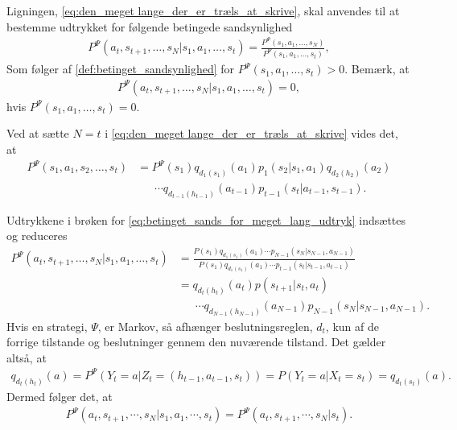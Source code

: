 Ligningen, \eqref{eq:den_meget lange_der_er_træls_at_skrive}, skal anvendes til at bestemme udtrykket for følgende betingede sandsynlighed 
\begin{align}
    P^\Psi(a_t , s_{t+1}, \dots, s_N | s_1 , a_1 , \dots , s_t) = \frac{P^\Psi(s_1 , a_1 , \dots , s_N)}{P^\Psi(s_1 , a_1 , \dots , s_t)}, \label{eq:betinget_sands_for_meget_lang_udtryk}
\end{align}
Som følger af 
\autoref{def:betinget_sandsynlighed} for $P^\Psi(s_1 , a_1 , \dots , s_t) > 0$. Bemærk, at
\begin{align*}
    P^\Psi(a_t , s_{t+1}, \dots, s_N | s_1 , a_1 , \dots , s_t) = 0, 
\end{align*}
hvis $P^\Psi(s_1 , a_1 , \dots , s_t) = 0$.


Ved at sætte $N=t$ i \eqref{eq:den_meget lange_der_er_træls_at_skrive} vides det, at 
\begin{align*}
    P^\Psi(s_1 , a_1 , s_2 , \dots , s_t) &= P^\Psi(s_1)q_{d_1(s_1)}(a_1)p_1(s_2|s_1 , a_1)q_{d_2(h_2)}(a_2)\\
     &\phantom{= \ }\cdots q_{d_{t-1}(h_{t-1})}(a_{t-1})p_{t-1}(s_t|a_{t-1} , s_{t-1}).
\end{align*}

Udtrykkene i brøken for \eqref{eq:betinget_sands_for_meget_lang_udtryk} indsættes og reduceres
\begin{align*}
P^\Psi(a_t , s_{t+1}, \dots, s_N | s_1 , a_1 , \dots , s_t) &=\frac{P(s_1)q_{d_1(s_1)}(a_1)
    \cdots p_{N-1}(s_N|s_{N-1} , a_{N-1})}{P(s_1)q_{d_1(s_1)}(a_1)
    \cdots p_{t-1}(s_t|s_{t-1} , a_{t-1})}\\
    &= q_{d_t(h_t)}(a_t)p(s_{t+1}|s_t , a_t)\\
    &\phantom{= \ } \cdots q_{d_{N-1}(h_{N-1})}(a_{N-1})p_{N-1}(s_N|s_{N-1} , a_{N-1}).
\end{align*}
Hvis en strategi, $\Psi$, er Markov, så afhænger beslutningsreglen, $d_t$, kun af de forrige tilstande og beslutninger gennem den nuværende tilstand. Det gælder altså, at 
\begin{align*}
    q_{d_t(h_t)}(a)= P^\Psi \left(Y_t = a | Z_t = (h_{t-1} , a_{t-1} , s_t) \right) = P \left(Y_t = a | X_t = s_t\right) = q_{d_t(s_t)}(a).
\end{align*}
Dermed følger det, at
\begin{align*}
    P^{\Psi}\left(a_t , s_{t+1} , \cdots , s_N|s_1 , a_1 , \cdots , s_t\right)=P^{\Psi}\left(a_t , s_{t+1} , \cdots , s_N|s_t\right).
\end{align*}

